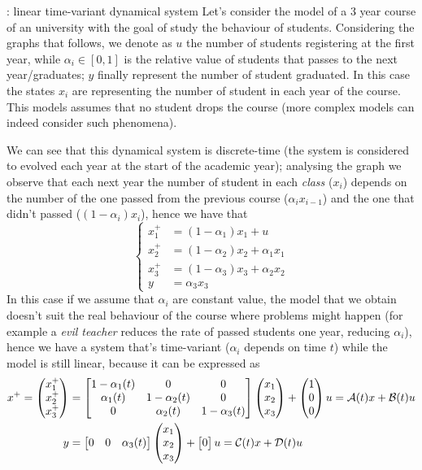 	\begin{example}{: linear time-variant dynamical system}
		Let's consider the model of a 3 year course of an university with the goal of study the behaviour of students. Considering the graphs that follows, we denote as $u$ the number of students registering at the first year, while $\alpha_i \in [0,1]$ is the relative value of students that passes to the next year/graduates; $y$ finally represent the number of student graduated. In this case the states $x_i$ are representing the number of student in each year of  the course. This models assumes that no student drops the course (more complex models can indeed consider such phenomena).
		\begin{center}
		\end{center}
		
		We can see that this dynamical system is discrete-time (the system is considered to evolved each year at the start of the academic year); analysing the graph we observe that each next year the number of student in each \textit{class} ($x_i$) depends on the number of the one passed from the previous course ($\alpha_i x_{i-1}$) and the one that didn't passed ($(1-\alpha_i)x_i$), hence we have that
		\[\begin{cases}
			x_1^+ & = (1-\alpha_1)x_1 + u \\
			x_2^+ & = (1-\alpha_2)x_2 + \alpha_1 x_1 \\
			x_3^+ & = (1-\alpha_3)x_3 + \alpha_2 x_2 \\
			y & = \alpha_3 x_3
		\end{cases}\]	
		In this case if we assume that $\alpha_i$ are constant value, the model that we obtain doesn't suit the real behaviour of the course where problems might happen (for example a \textit{evil teacher} reduces the rate of passed students one year, reducing $\alpha_i$),	hence we have a system that's time-variant ($\alpha_i$ depends on time $t$) while the model is still linear, because it can be expressed as
		\begin{align*}
			x^+ = \begin{pmatrix} x_1^+ \\ x_2^+ \\ x_3^+ \end{pmatrix} & = \begin{bmatrix} 1-\alpha_1(t) & 0 & 0 \\ \alpha_1(t) & 1-\alpha_2(t) & 0 \\ 0 & \alpha_2(t) & 1-\alpha_3(t) \end{bmatrix} \begin{pmatrix} x_1 \\ x_2 \\ x_3 \end{pmatrix} + \begin{pmatrix} 1 \\0 \\0  \end{pmatrix} u = \mathcal{A}(t)x + \mathcal{B}(t)u \\
			y & = \begin{bmatrix} 0 & 0 & \alpha_3(t) \end{bmatrix} \begin{pmatrix} x_1 \\ x_2 \\ x_3 \end{pmatrix} + \begin{bmatrix} 0 \end{bmatrix} u = \mathcal{C}(t)x + \mathcal{D}(t) u
		\end{align*}
	\end{example}
	
